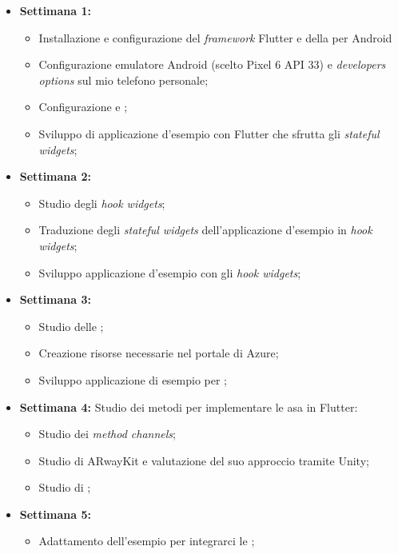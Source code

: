 \begin{itemize}
  \item \textbf{Settimana 1:} 
      \begin{itemize}
          \item Installazione e configurazione del \textit{framework} Flutter e della \sdk{} per Android 
          \item Configurazione emulatore Android (scelto Pixel 6 API 33) e 
          \textit{developers options} sul mio telefono personale;
          \item Configurazione \vsc{} e \astudio;
          \item Sviluppo di applicazione d'esempio con Flutter che sfrutta gli \textit{stateful widgets};
      \end{itemize} 
  \item \textbf{Settimana 2:} 
      \begin{itemize}
          \item Studio degli \textit{hook widgets};
          \item Traduzione degli \textit{stateful widgets} dell'applicazione d'esempio in \textit{hook widgets};
          \item Sviluppo applicazione d'esempio con gli \textit{hook widgets};
      \end{itemize}
  \item \textbf{Settimana 3:} 
      \begin{itemize}
          \item Studio delle \asa;
          \item Creazione risorse necessarie nel portale di Azure;
          \item Sviluppo applicazione di esempio per \asa{};
      \end{itemize}
  \item \textbf{Settimana 4:} Studio dei metodi per implementare le asa in Flutter:
      \begin{itemize}
          \item Studio dei \textit{method channels};
          \item Studio di ARwayKit e valutazione del suo approccio tramite Unity;
          \item Studio di \aplug;
      \end{itemize}
  \item \textbf{Settimana 5:} 
      \begin{itemize}
          \item Adattamento dell'esempio \aplug{} per integrarci le \asa{};

\end{itemize}
\end{itemize}
